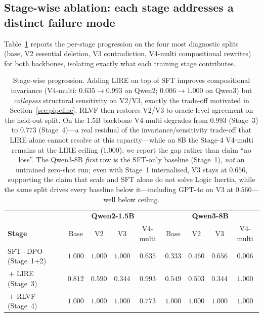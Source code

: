 \documentclass{article}
\begin{document}
\subsection{Stage-wise ablation: each stage addresses a distinct failure mode}
\label{sec:ablation-stagewise}
Table~\ref{tab:stage_wise} reports the per-stage progression on the four most diagnostic splits (base, V2 essential deletion, V3 contradiction, V4-multi compositional rewrites) for both backbones, isolating exactly what each training stage contributes.

\begin{table}[h]
\centering\small
\caption{Stage-wise progression. Adding LIRE on top of SFT improves compositional invariance (V4-multi: $0.635{\to}0.993$ on Qwen2; $0.006{\to}1.000$ on Qwen3) but \emph{collapses} structural sensitivity on V2/V3, exactly the trade-off motivated in Section~\ref{sec:pipeline}. RLVF then restores V2/V3 to oracle-level agreement on the held-out split. On the $1.5$B backbone V4-multi degrades from $0.993$ (Stage~3) to $0.773$ (Stage~4)---a real residual of the invariance/sensitivity trade-off that LIRE alone cannot resolve at this capacity---while on $8$B the Stage-4 V4-multi remains at the LIRE ceiling ($1.000$); we report the gap rather than claim ``no loss''. The Qwen3-8B \emph{first} row is the SFT-only baseline (Stage~1), \emph{not} an untrained zero-shot run; even with Stage~1 internalised, V3 stays at $0.656$, supporting the claim that scale and SFT alone do not solve Logic Inertia, while the same split drives every baseline below it---including GPT-4o on V3 at $0.560$---well below ceiling.}
\label{tab:stage_wise}
\begin{tabular}{l|cccc|cccc}
\toprule
& \multicolumn{4}{c|}{\textbf{Qwen2-1.5B}} & \multicolumn{4}{c}{\textbf{Qwen3-8B}} \\
\textbf{Stage}            & Base & V2   & V3   & V4-multi & Base & V2   & V3   & V4-multi \\
\midrule
SFT+DPO (Stage~1+2)       & $1.000$ & $1.000$ & $1.000$ & $0.635$  & $0.333$ & $0.460$ & $0.656$ & $0.006$  \\
\,$+$ LIRE (Stage~3)      & $0.812$ & $0.590$ & $0.344$ & $\mathbf{0.993}$ & $0.549$ & $0.503$ & $0.344$ & $\mathbf{1.000}$ \\
\,$+$ RLVF (Stage~4)      & $\mathbf{1.000}$ & $\mathbf{1.000}$ & $\mathbf{1.000}$ & $0.773$ & $\mathbf{1.000}$ & $\mathbf{1.000}$ & $\mathbf{1.000}$ & $\mathbf{1.000}$ \\
\bottomrule
\end{tabular}
\end{table}
\end{document}
